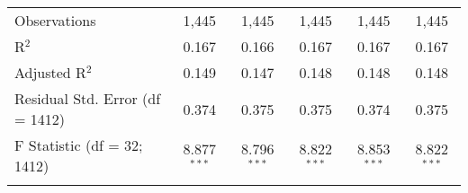 \documentclass{article}
\begin{document}
\begin{table}[!htbp]
{\begin{tabular}{@{\extracolsep{5pt}}lccccc}
Observations & 1,445 & 1,445 & 1,445 & 1,445 & 1,445 \\ 
R$^{2}$ & 0.167 & 0.166 & 0.167 & 0.167 & 0.167 \\ 
Adjusted R$^{2}$ & 0.149 & 0.147 & 0.148 & 0.148 & 0.148 \\ 
Residual Std. Error (df = 1412) & 0.374 & 0.375 & 0.375 & 0.374 & 0.375 \\ 
F Statistic (df = 32; 1412) & 8.877$^{***}$ & 8.796$^{***}$ & 8.822$^{***}$ & 8.853$^{***}$ & 8.822$^{***}$ \\ 
\hline 
\hline \\[-1.8ex] 
\end{tabular} }
\end{table} 
\end{document}
